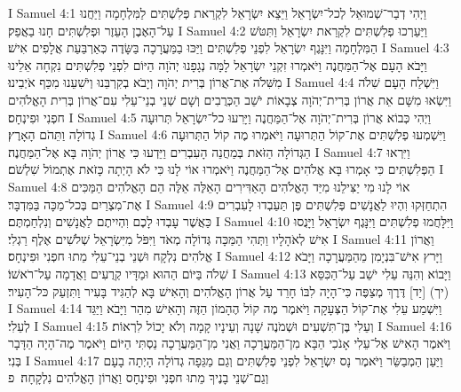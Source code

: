 I Samuel 4:1	וַיְהִי דְבַר־שְׁמוּאֵל לְכל־יִשְׂרָאֵל וַיֵּצֵא יִשְׂרָאֵל לִקְרַאת פְּלִשְׁתִּים לַמִּלְחָמָה וַיַּחֲנוּ עַל־הָאֶבֶן הָעֵזֶר וּפְלִשְׁתִּים חָנוּ בַאֲפֵק׃
I Samuel 4:2	וַיַּעַרְכוּ פְלִשְׁתִּים לִקְרַאת יִשְׂרָאֵל וַתִּטֹּשׁ הַמִּלְחָמָה וַיִּנָּגֶף יִשְׂרָאֵל לִפְנֵי פְלִשְׁתִּים וַיַּכּוּ בַמַּעֲרָכָה בַּשָּׂדֶה כְּאַרְבַּעַת אֲלָפִים אִישׁ׃
I Samuel 4:3	וַיָּבֹא הָעָם אֶל־הַמַּחֲנֶה וַיֹּאמְרוּ זִקְנֵי יִשְׂרָאֵל לָמָּה נְגָפָנוּ יְהֹוָה הַיּוֹם לִפְנֵי פְלִשְׁתִּים נִקְחָה אֵלֵינוּ מִשִּׁלֹה אֶת־אֲרוֹן בְּרִית יְהֹוָה וְיָבֹא בְקִרְבֵּנוּ וְיֹשִׁעֵנוּ מִכַּף אֹיְבֵינוּ׃
I Samuel 4:4	וַיִּשְׁלַח הָעָם שִׁלֹה וַיִּשְׂאוּ מִשָּׁם אֵת אֲרוֹן בְּרִית־יְהֹוָה צְבָאוֹת יֹשֵׁב הַכְּרֻבִים וְשָׁם שְׁנֵי בְנֵי־עֵלִי עִם־אֲרוֹן בְּרִית הָאֱלֹהִים חפְנִי וּפִינְחָס׃
I Samuel 4:5	וַיְהִי כְּבוֹא אֲרוֹן בְּרִית־יְהֹוָה אֶל־הַמַּחֲנֶה וַיָּרִעוּ כל־יִשְׂרָאֵל תְּרוּעָה גְדוֹלָה וַתֵּהֹם הָאָרֶץ׃
I Samuel 4:6	וַיִּשְׁמְעוּ פְלִשְׁתִּים אֶת־קוֹל הַתְּרוּעָה וַיֹּאמְרוּ מֶה קוֹל הַתְּרוּעָה הַגְּדוֹלָה הַזֹּאת בְּמַחֲנֵה הָעִבְרִים וַיֵּדְעוּ כִּי אֲרוֹן יְהֹוָה בָּא אֶל־הַמַּחֲנֶה׃
I Samuel 4:7	וַיִּרְאוּ הַפְּלִשְׁתִּים כִּי אָמְרוּ בָּא אֱלֹהִים אֶל־הַמַּחֲנֶה וַיֹּאמְרוּ אוֹי לָנוּ כִּי לֹא הָיְתָה כָּזֹאת אֶתְמוֹל שִׁלְשֹׁם׃
I Samuel 4:8	אוֹי לָנוּ מִי יַצִּילֵנוּ מִיַּד הָאֱלֹהִים הָאַדִּירִים הָאֵלֶּה אֵלֶּה הֵם הָאֱלֹהִים הַמַּכִּים אֶת־מִצְרַיִם בְּכל־מַכָּה בַּמִּדְבָּר׃
I Samuel 4:9	הִתְחַזְּקוּ וִהְיוּ לַאֲנָשִׁים פְּלִשְׁתִּים פֶּן תַּעַבְדוּ לָעִבְרִים כַּאֲשֶׁר עָבְדוּ לָכֶם וִהְיִיתֶם לַאֲנָשִׁים וְנִלְחַמְתֶּם׃
I Samuel 4:10	וַיִּלָּחֲמוּ פְלִשְׁתִּים וַיִּנָּגֶף יִשְׂרָאֵל וַיָּנֻסוּ אִישׁ לְאֹהָלָיו וַתְּהִי הַמַּכָּה גְּדוֹלָה מְאֹד וַיִּפֹּל מִיִּשְׂרָאֵל שְׁלֹשִׁים אֶלֶף רַגְלִי׃
I Samuel 4:11	וַאֲרוֹן אֱלֹהִים נִלְקָח וּשְׁנֵי בְנֵי־עֵלִי מֵתוּ חפְנִי וּפִינְחָס׃
I Samuel 4:12	וַיָּרץ אִישׁ־בִּנְיָמִן מֵהַמַּעֲרָכָה וַיָּבֹא שִׁלֹה בַּיּוֹם הַהוּא וּמַדָּיו קְרֻעִים וַאֲדָמָה עַל־רֹאשׁוֹ׃
I Samuel 4:13	וַיָּבוֹא וְהִנֵּה עֵלִי יֹשֵׁב עַל־הַכִּסֵּא (יך) [יַד] דֶּרֶךְ מְצַפֶּה כִּי־הָיָה לִבּוֹ חָרֵד עַל אֲרוֹן הָאֱלֹהִים וְהָאִישׁ בָּא לְהַגִּיד בָּעִיר וַתִּזְעַק כּל־הָעִיר׃
I Samuel 4:14	וַיִּשְׁמַע עֵלִי אֶת־קוֹל הַצְּעָקָה וַיֹּאמֶר מֶה קוֹל הֶהָמוֹן הַזֶּה וְהָאִישׁ מִהַר וַיָּבֹא וַיַּגֵּד לְעֵלִי׃
I Samuel 4:15	וְעֵלִי בֶּן־תִּשְׁעִים וּשְׁמֹנֶה שָׁנָה וְעֵינָיו קָמָה וְלֹא יָכוֹל לִרְאוֹת׃
I Samuel 4:16	וַיֹּאמֶר הָאִישׁ אֶל־עֵלִי אָנֹכִי הַבָּא מִן־הַמַּעֲרָכָה וַאֲנִי מִן־הַמַּעֲרָכָה נַסְתִּי הַיּוֹם וַיֹּאמֶר מֶה־הָיָה הַדָּבָר בְּנִי׃
I Samuel 4:17	וַיַּעַן הַמְבַשֵּׂר וַיֹּאמֶר נָס יִשְׂרָאֵל לִפְנֵי פְלִשְׁתִּים וְגַם מַגֵּפָה גְדוֹלָה הָיְתָה בָעָם וְגַם־שְׁנֵי בָנֶיךָ מֵתוּ חפְנִי וּפִינְחָס וַאֲרוֹן הָאֱלֹהִים נִלְקָחָה׃ {פ}
